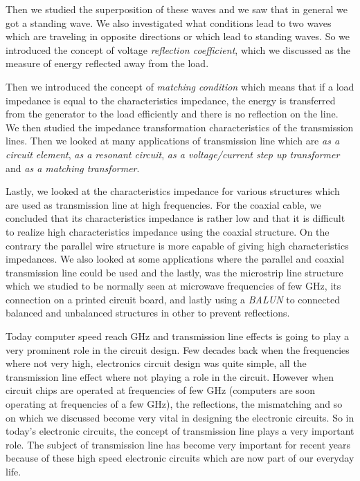 Then we studied the superposition of these waves and we saw that in general we got a standing wave. We also investigated what conditions lead to two waves which are traveling in opposite directions or which lead to standing waves. So we introduced the concept of voltage \emph{reflection coefficient}, which we discussed as the measure of energy reflected away from the load.

Then we introduced the concept of \emph{matching condition} which means that if a load impedance is equal to the characteristics impedance, the energy is transferred from the generator to the load efficiently and there is no reflection on the line. We then studied the impedance transformation characteristics of the transmission lines. Then we looked at many applications of transmission line which are \emph{as a circuit element}, \emph{as a resonant circuit}, \emph{as a voltage/current step up transformer} and \emph{as a matching transformer}.

Lastly, we looked at the characteristics impedance for various structures which are used as transmission line at high frequencies. For the coaxial cable, we concluded that its characteristics impedance is rather low and that it is difficult to realize high characteristics impedance using the coaxial structure. On the contrary the parallel wire structure is more capable of giving high characteristics impedances. We also looked at some applications where the parallel and coaxial transmission line could be used and the lastly, was the microstrip line structure which we studied to be normally seen at microwave frequencies of few GHz, its connection on a printed circuit board, and lastly using a \emph{BALUN} to connected balanced and unbalanced structures in other to prevent reflections.

Today computer speed reach GHz and transmission line effects is going to play a very prominent role in the circuit design. Few decades back when the frequencies where not very high, electronics circuit design was quite simple, all the transmission line effect where not playing a role in the circuit. However when circuit chips are operated at frequencies of few GHz (computers are soon operating at frequencies of a few GHz), the reflections, the mismatching and so on which we discussed become very vital in designing the electronic circuits. So in today's electronic circuits, the concept of transmission line plays a very important role. The subject of transmission line has become very important for recent years because of these high speed electronic circuits which are now part of our everyday life.
